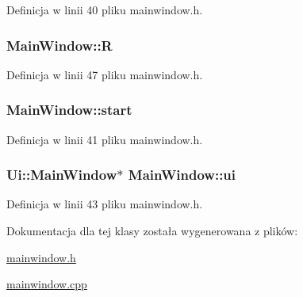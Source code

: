 \-Definicja w linii 40 pliku mainwindow.\-h.

\hypertarget{class_main_window_a38c1321667bd8650828922d1c779b6ef}{
\subsubsection[{\-R}]{ {\bf \-Main\-Window\-::\-R}}}\label{class_main_window_a38c1321667bd8650828922d1c779b6ef}


\-Definicja w linii 47 pliku mainwindow.\-h.

\hypertarget{class_main_window_aaaecb46583504233ea801b4ec34e9f29}{
\subsubsection[{start}]{ {\bf \-Main\-Window\-::start}}}\label{class_main_window_aaaecb46583504233ea801b4ec34e9f29}


\-Definicja w linii 41 pliku mainwindow.\-h.

\hypertarget{class_main_window_a35466a70ed47252a0191168126a352a5}{
\subsubsection[{ui}]{\setlength{\rightskip}{0pt plus 5cm}\-Ui\-::\-Main\-Window$\ast$ {\bf \-Main\-Window\-::ui}}}\label{class_main_window_a35466a70ed47252a0191168126a352a5}


\-Definicja w linii 43 pliku mainwindow.\-h.



\-Dokumentacja dla tej klasy została wygenerowana z plików\-:\begin{DoxyCompactItemize}
\item 
\hyperlink{mainwindow_8h}{mainwindow.\-h}\item 
\hyperlink{mainwindow_8cpp}{mainwindow.\-cpp}\end{DoxyCompactItemize}
